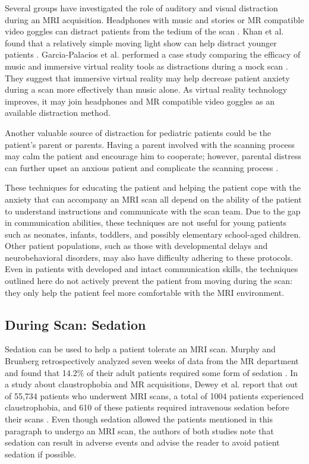 Several groups have investigated the role of auditory and visual distraction during an MRI acquisition. Headphones with music and stories or MR compatible video goggles can distract patients from the tedium of the scan \cite{Alexander2012} \cite{Barnea-Goraly2014} \cite{Harned2001}. Khan et al. found that a relatively simple moving light show can help distract younger patients \cite{Khan2007}. Garcia-Palacios et al. performed a case study comparing the efficacy of music and immersive virtual reality tools as distractions during a mock scan \cite{Garcia-Palacios2007}. They suggest that immersive virtual reality may help decrease patient anxiety during a scan more effectively than music alone. As virtual reality technology improves, it may join headphones and MR compatible video goggles as an available distraction method.

Another valuable source of distraction for pediatric patients could be the patient's parent or parents. Having a parent involved with the scanning process may calm the patient and encourage him to cooperate; however, parental distress can further upset an anxious patient and complicate the scanning process \cite{Alexander2012}. 

These techniques for educating the patient and helping the patient cope with the anxiety that can accompany an MRI scan all depend on the ability of the patient to understand instructions and communicate with the scan team. Due to the gap in communication abilities, these techniques are not useful for young patients such as neonates, infants, toddlers, and possibly elementary school-aged children. Other patient populations, such as those with developmental delays and neurobehavioral disorders, may also have difficulty adhering to these protocols. Even in patients with developed and intact communication skills, the techniques outlined here do not actively prevent the patient from moving during the scan: they only help the patient feel more comfortable with the MRI environment.

\subsection{During Scan: Sedation}

Sedation can be used to help a patient tolerate an MRI scan. Murphy and Brunberg retrospectively analyzed seven weeks of data from the MR department and found that 14.2\% of their adult patients required some form of sedation \cite{Murphy1997}. In a study about claustrophobia and MR acquisitions, Dewey et al. report that out of 55,734 patients who underwent MRI scans, a total of 1004 patients experienced claustrophobia, and 610 of these patients required intravenous sedation before their scans \cite{Dewey2007}. Even though sedation allowed the patients mentioned in this paragraph to undergo an MRI scan, the authors of both studies note that sedation can result in adverse events and advise the reader to avoid patient sedation if possible.

